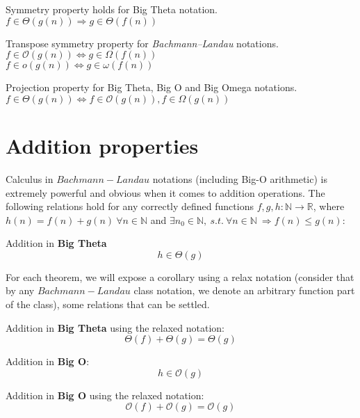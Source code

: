 \begin{theorem} Symmetry property holds for Big Theta notation. \\  $ f \in \Theta(g(n)) \Rightarrow g \in \Theta(f(n)) $
\end{theorem} 

\begin{theorem} Transpose symmetry property for \textit{Bachmann–Landau} notations.  \\  $ f \in \mathcal{O}(g(n)) \Leftrightarrow g \in \Omega(f(n)) $
 \\  $ f \in o(g(n)) \Leftrightarrow g \in \omega(f(n)) $
\end{theorem} 
 
\begin{theorem} Projection property for Big Theta, Big O and Big Omega notations. \\  $ f \in \Theta(g(n)) \Leftrightarrow f \in \mathcal{O}(g(n)), f \in \Omega(g(n)) $
\end{theorem}
 
\section{Addition properties}
Calculus in $Bachmann-Landau$ notations (including Big-O arithmetic) is extremely powerful and obvious when it comes to addition operations. The following relations hold for any correctly defined functions $f, g, h:\mathbb{N}\longrightarrow\mathbb{R}$, where $ h(n) = f(n) + g(n)\  \forall n \in  \mathbb{N} $ and $\exists n_{0} \in \mathbb{N},\ s.t.\ \forall n \in \mathbb{N} \ \Rightarrow f(n) \leq g(n)$:


 
  \begin{lemma} Addition in \textbf{Big Theta}
 \[  h \in \Theta(g)\]
  \end{lemma}
  \begin{remark}
  For each theorem, we will expose a corollary using a relax notation (consider that by any $Bachmann-Landau$ class notation, we denote an arbitrary function part of the class), some relations that can be settled.
\end{remark}
  \begin{corollary} Addition in \textbf{Big Theta} using the relaxed notation: 
  \[  \Theta(f) + \Theta(g) = \Theta(g)\]
  \end{corollary}
  
  \begin{lemma} Addition in \textbf{Big O}: 
 \[  h \in \mathcal{O}(g)\]
  \end{lemma}
   \begin{corollary} Addition in \textbf{Big O} using the relaxed notation: 
  \[  \mathcal{O}(f) + \mathcal{O}(g) = \mathcal{O}(g)\]
  \end{corollary}  
  
